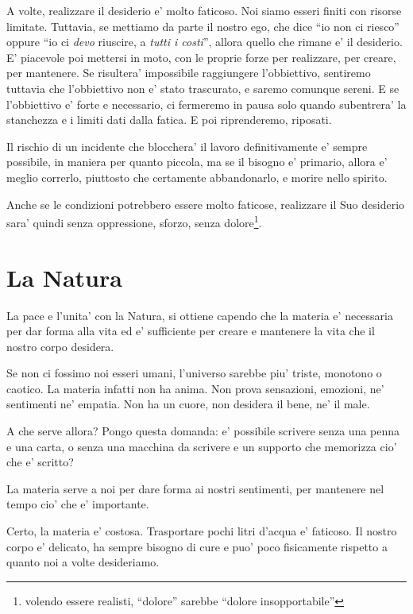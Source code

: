 A volte, realizzare il desiderio e' molto faticoso. Noi siamo esseri finiti con risorse limitate. Tuttavia, se mettiamo da parte il nostro ego, che dice ``io non ci riesco'' oppure ``io ci \emph{devo} riuscire, a \emph{tutti i costi}'', allora quello che rimane e' il desiderio. E' piacevole poi mettersi in moto, con le proprie forze per realizzare, per creare, per mantenere. Se risultera' impossibile raggiungere l'obbiettivo, sentiremo tuttavia che l'obbiettivo non e' stato trascurato, e saremo comunque sereni. E se l'obbiettivo e' forte e necessario, ci fermeremo in pausa solo quando subentrera' la stanchezza e i limiti dati dalla fatica. E poi riprenderemo, riposati.

Il rischio di un incidente che blocchera' il lavoro definitivamente e' sempre possibile, in maniera per quanto piccola, ma se il bisogno e' primario, allora e' meglio correrlo, piuttosto che certamente abbandonarlo, e morire nello spirito.

Anche se le condizioni potrebbero essere molto faticose, realizzare il Suo desiderio sara' quindi senza oppressione, sforzo, senza dolore\footnote{volendo essere realisti, ``dolore'' sarebbe ``dolore insopportabile''}.


\section{La Natura}
La pace e l'unita' con la Natura, si ottiene capendo che la materia e' necessaria per dar forma alla vita ed e' sufficiente per creare e mantenere la vita che il nostro corpo desidera.

Se non ci fossimo noi esseri umani, l'universo sarebbe piu' triste, monotono o caotico. La materia infatti non ha anima. Non prova sensazioni, emozioni, ne' sentimenti ne' empatia. Non ha un cuore, non desidera il bene, ne' il male.

A che serve allora? Pongo questa domanda: e' possibile scrivere senza una penna e una carta, o senza una macchina da scrivere e un supporto che memorizza cio' che e' scritto?

La materia serve a noi per dare forma ai nostri sentimenti, per mantenere nel tempo cio' che e' importante.

Certo, la materia e' costosa. Trasportare pochi litri d'acqua e' faticoso. Il nostro corpo e' delicato, ha sempre bisogno di cure e puo' poco fisicamente rispetto a quanto noi a volte desideriamo.


